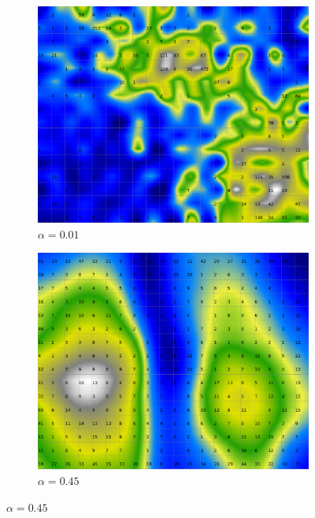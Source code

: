 \documentclass{acm_proc_article-sp}
\begin{document}
\begin{figure}
\centering
    \centering
    \begin{subfigure}[b]{0.24\linewidth}
        \includegraphics[width=\linewidth]{img/wine-20x16-smoothed-data-histogram-alpha-0,01-f-100}
        \caption{$\alpha=0.01$}
        \label{fig:wine-20x16-smoothed-data-histogram-alpha-0,01-f-100}
    \end{subfigure}
    \begin{subfigure}[b]{0.24\linewidth}
        \includegraphics[width=\linewidth]{img/wine-20x16-smoothed-data-histogram-alpha-0,45-f-100}
        \caption{$\alpha=0.45$}

\end{subfigure}
\end{figure}
\end{document}
